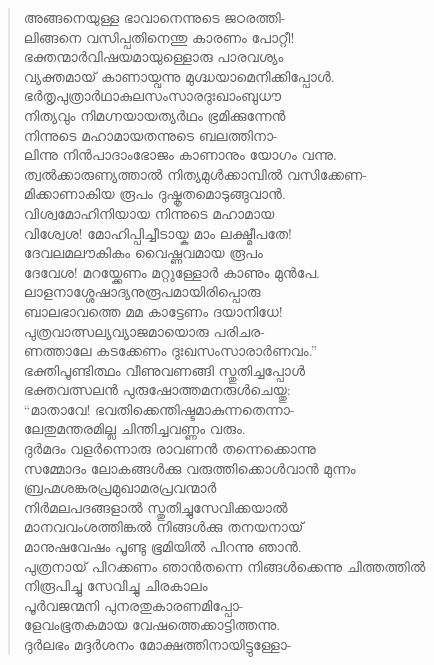\begin{verse}
അങ്ങനെയുള്ള ഭാവാനെന്നുടെ ജഠരത്തി-\\
ലിങ്ങനെ വസിപ്പതിനെന്തു കാരണം പോറ്റീ!\\
ഭക്തന്മാര്‍വിഷയമായുള്ളൊരു പാരവശ്യം\\
വ്യക്തമായ് കാണായ്വന്നു മുഗ്ദ്ധയാമെനിക്കിപ്പോള്‍.\\
ഭര്‍തൃപുത്രാര്‍ഥാകുലസംസാരദുഃഖാംബുധൗ\\
നിത്യവും നിമഗ്നയായത്യര്‍ഥം ഭ്രമിക്കുന്നേന്‍\\
നിന്നുടെ മഹാമായതന്നുടെ ബലത്തിനാ-\\
ലിന്നു നിന്‍പാദാംഭോജം കാണാനും യോഗം വന്നു.\\
ത്വല്‍ക്കാരുണ്യത്താല്‍ നിത്യമുള്‍ക്കാമ്പില്‍ വസിക്കേണ-\\
മിക്കാണാകിയ രൂപം ദുഷ്കൃതമൊടുങ്ങുവാന്‍.\\
വിശ്വമോഹിനിയായ നിന്നുടെ മഹാമായ\\
വിശ്വേശ! മോഹിപ്പിച്ചീടായ്ക മാം ലക്ഷ്മീപതേ!\\
ദേവലമലൗകികം വൈഷ്ണവമായ രൂപം\\
ദേവേശ! മറയ്ക്കേണം മറ്റുള്ളോര്‍ കാണും മുന്‍പേ.\\
ലാളനാശ്ശേഷാദ്യനുരൂപമായിരിപ്പൊരു\\
ബാലഭാവത്തെ മമ കാട്ടേണം ദയാനിധേ!\\
പുത്രവാത്സല്യവ്യാജമായൊരു പരിചര-\\
ണത്താലേ കടക്കേണം ദുഃഖസംസാരാര്‍ണവം.”\\
ഭക്തിപൂണ്ടിത്ഥം വീണുവണങ്ങി സ്തുതിച്ചപ്പോള്‍\\
ഭക്തവത്സലന്‍ പുരുഷോത്തമനരുള്‍ചെയ്തു:\\
“മാതാവേ! ഭവതിക്കെന്തിഷ്ടമാകുന്നതെന്നാ-\\
ലേതുമന്തരമില്ല ചിന്തിച്ചവണ്ണം വരും.\\
ദുര്‍മദം വളര്‍ന്നൊരു രാവണന്‍ തന്നെക്കൊന്നു\\
സമ്മോദം ലോകങ്ങള്‍ക്കു വരുത്തിക്കൊള്‍വാന്‍ മുന്നം\\
ബ്രഹ്മശങ്കരപ്രമുഖാമരപ്രവന്മാര്‍\\
നിര്‍മലപദങ്ങളാല്‍ സ്തുതിച്ചുസേവിക്കയാല്‍\\
മാനവവംശത്തിങ്കല്‍ നിങ്ങള്‍ക്കു തനയനായ്\\
മാനുഷവേഷം പൂണ്ടു ഭൂമിയില്‍ പിറന്നു ഞാന്‍.\\
പുത്രനായ് പിറക്കണം ഞാന്‍തന്നെ നിങ്ങള്‍ക്കെന്നു ചിത്തത്തില്‍ നിരൂപിച്ചു സേവിച്ചു ചിരകാലം\\
പൂര്‍വജന്മനി പുനരതുകാരണമിപ്പോ-\\
ളേവംഭൂതകമായ വേഷത്തെക്കാട്ടിത്തന്നു.\\
ദുര്‍ലഭം മദ്ദര്‍ശനം മോക്ഷത്തിനായിട്ടുള്ളോ-\\

\end{verse}
